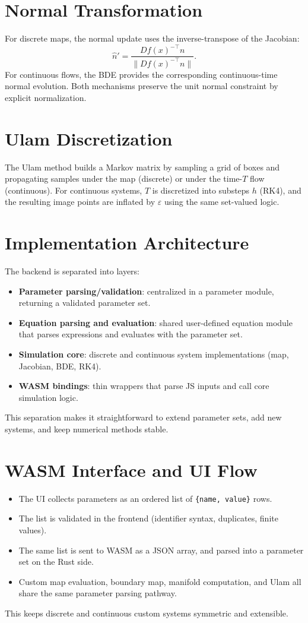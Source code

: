 \documentclass[11pt]{article}
\begin{document}
\section{Normal Transformation}
For discrete maps, the normal update uses the inverse-transpose of the Jacobian:
\begin{equation}
\hat{n}' = \frac{Df(x)^{-\top} n}{\|Df(x)^{-\top} n\|}.
\end{equation}
For continuous flows, the BDE provides the corresponding continuous-time normal evolution. Both mechanisms preserve the unit normal constraint by explicit normalization.

\section{Ulam Discretization}
The Ulam method builds a Markov matrix by sampling a grid of boxes and propagating samples under the map (discrete) or under the time-$T$ flow (continuous). For continuous systems, $T$ is discretized into substeps $h$ (RK4), and the resulting image points are inflated by $\varepsilon$ using the same set-valued logic.

\section{Implementation Architecture}
The backend is separated into layers:
\begin{itemize}
\item \textbf{Parameter parsing/validation}: centralized in a parameter module, returning a validated parameter set.
\item \textbf{Equation parsing and evaluation}: shared user-defined equation module that parses expressions and evaluates with the parameter set.
\item \textbf{Simulation core}: discrete and continuous system implementations (map, Jacobian, BDE, RK4).
\item \textbf{WASM bindings}: thin wrappers that parse JS inputs and call core simulation logic.
\end{itemize}
This separation makes it straightforward to extend parameter sets, add new systems, and keep numerical methods stable.

\section{WASM Interface and UI Flow}
\begin{itemize}
\item The UI collects parameters as an ordered list of \texttt{\{name, value\}} rows.
\item The list is validated in the frontend (identifier syntax, duplicates, finite values).
\item The same list is sent to WASM as a JSON array, and parsed into a parameter set on the Rust side.
\item Custom map evaluation, boundary map, manifold computation, and Ulam all share the same parameter parsing pathway.
\end{itemize}
This keeps discrete and continuous custom systems symmetric and extensible.
\end{document}
